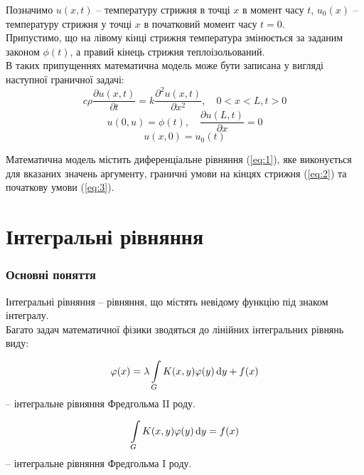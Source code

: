 Позначимо $u(x, t)$ -- температуру стрижня в точці $x$ в момент часу $t$, $u_0(x)$ -- температуру стрижня у точці $x$ в початковий момент часу $t = 0$. \\

Припустимо, що на лівому кінці стрижня температура змінюється за заданим законом $\phi(t)$, а правий кінець стрижня теплоізольований. \\

В таких припущеннях математична модель може бути записана у вигляді наступної граничної задачі:
\begin{equation}
	\label{eq:1}
	c \rho \dfrac{\partial u(x, t)}{\partial t} = k \dfrac{\partial^2 u(x, t)}{\partial x^2}, \quad 0 < x < L, t > 0
\end{equation}
\begin{equation}
	\label{eq:2}
	u(0, u) = \phi(t), \quad  \dfrac{\partial u(L, t)}{\partial x} = 0
\end{equation}
\begin{equation}
	\label{eq:3}
	u(x, 0) = u_0(t)
\end{equation}

Математична модель містить диференціальне рівняння (\ref{eq:1}), яке виконується для вказаних значень аргументу, граничні умови на кінцях стрижня (\ref{eq:2}) та початкову умови (\ref{eq:3}).

\section{Інтегральні рівняння}

\subsubsection{Основні поняття}

Інтегральні рівняння -- рівняння, що містять невідому функцію під знаком інтегралу. \\

Багато задач математичної фізики зводяться до лінійних інтегральних рівнянь виду:

\begin{equation}
	\label{eq:*.1}
	\varphi(x) = \lambda \displaystyle\int\limits_G K(x, y) \varphi(y) \mathop{}\!\mathrm{d} y + f(x)
\end{equation}
-- інтегральне рівняння Фредгольма II роду.

\begin{equation}
	\label{eq:*.2}
	\displaystyle\int\limits_G K(x, y) \varphi(y) \mathop{}\!\mathrm{d} y = f(x)
\end{equation}
-- інтегральне рівняння Фредгольма I роду. \\

